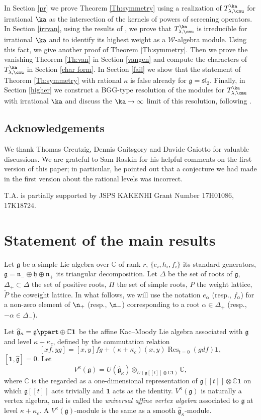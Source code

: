 \documentclass{amsart}
\newcommand{\on}{\operatorname}
\newcommand{\+}{\mathop{\oplus}}
\renewcommand{\*}{{\otimes}}
\newcommand{\mc}{\mathcal}
\newcommand{\mf}{\mathfrak}
\newcommand{\g}{\mf{g}}
\newcommand{\h}{\mf{h}}
\newcommand{\affg}{\widehat{\mf{g}}}
\newcommand{\C}{\mathbb{C}}
\newcommand{\lam}{\lambda}
\theoremstyle{theorem}
\theoremstyle{remark}
\numberwithin{equation}{section}
\begin{document}
In Section \ref{pr} we prove Theorem \ref{Th:symmetry} using a
realization of $T^\ka_{\lam,\cmu}$ for irrational $\ka$ as the
intersection of the kernels of powers of screening operators. In
Section \ref{irrvan}, using the results of \cite{Ara04,Ara07}, we
prove that $T^\ka_{\lam,\cmu}$ is irreducible for irrational $\ka$ and
to identify its highest weight as a ${\mc W}$-algebra module. Using
this fact, we give another proof of Theorem \ref{Th:symmetry}. Then we
prove the vanishing Theorem \ref{Th:van} in Section \ref{vangen} and
compute the characters of $T^\ka_{\lam,\cmu}$ in Section \ref{char
  form}. In Section \ref{fail} we show that the statement of Theorem
\ref{Th:symmetry} with rational $\kappa$ is false already for
$\g=\mf{sl}_2$. Finally, in Section \ref{higher} we construct a
BGG-type resolution of the modules for $T^\ka_{\lam,\cmu}$ with
irrational $\ka$ and discuss the $\ka \to \infty$ limit of this
resolution, following \cite{FF93}.

\subsection*{Acknowledgements}

We thank Thomas Creutzig, Dennis Gaitsgory and Davide Gaiotto for
valuable discussions. We are grateful to Sam Raskin for his helpful
comments on the first version of this paper; in particular, he pointed
out that a conjecture we had made in the first version about the
rational levels was incorrect.

T.A. is partially supported by JSPS KAKENHI Grant Number 17H01086,
\linebreak 17K18724.

\section{Statement of the main results}    \label{statement}

Let $\g$ be a simple Lie algebra over $\C$ of rank $r$, $\{
e_i,h_i,f_i \}$ its standard generators, $\g=\mf{n}_-\+
\h\+\mf{n}_+$ its triangular decomposition. Let $\Delta$ be
the set of roots of $\g$, $\Delta_+ \subset \Delta$ the set of
positive roots, $\Pi$ the set of simple roots, $P$ the weight lattice,
$\check{P}$ the coweight lattice. In what follows, we will use the
notation $e_\alpha$ (resp., $f_\alpha$) for a non-zero element of
$\n_+$ (resp., $\n_-$) corresponding to a root $\alpha \in \Delta_+$
(resp., $-\alpha \in \Delta_-$).

Let $\affg_{\kappa}=\g\ppart\+\C \mathbf{1}$ be the affine Kac--Moody
Lie algebra associated with $\g$ and level $\kappa+\kappa_c$, defined
by the commutation relation
$$[xf,yg]=[x,y]fg+(\kappa+\kappa_c)(x,y)\on{Res}_{t=0}(gdf)\mathbf{1},$$
$[\mathbf{1},\affg]=0$.
Let 
$$
V^\kappa(\g)=U(\affg_\kappa)\*_{U(\g[[t]]\* \C \mathbf{1})}\C,
$$
where $\C$ is the regarded as a one-dimensional representation of 
$\g[[t]]\* \C \mathbf{1}$ on which $\g[[t]]$ acts trivially and
$\mathbf{1}$ acts as the identity.
$V^\kappa(\g)$ is naturally a vertex algebra, and is called the {\em
  universal affine vertex algebra}
associated to $\g$ at level $\kappa+\kappa_c$.
A $V^\kappa(\g)$-module is the same as a smooth $\affg_{\kappa}$-module.
\end{document}
